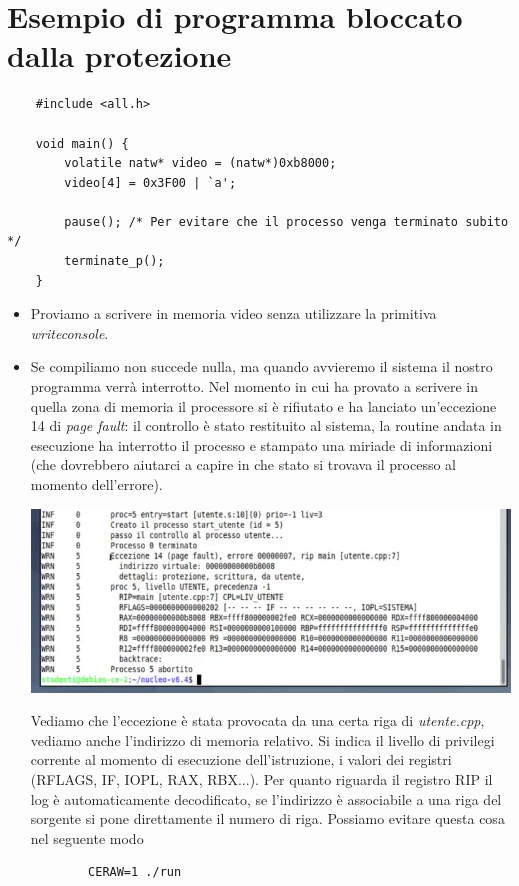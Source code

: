 \section{Esempio di programma bloccato dalla protezione}
\small
\begin{verbatim}
	#include <all.h>
	
	void main() {
		volatile natw* video = (natw*)0xb8000;
		video[4] = 0x3F00 | `a';
		
		pause(); /* Per evitare che il processo venga terminato subito */
		terminate_p();
	}
\end{verbatim}
\normalsize
\begin{itemize}
	\item Proviamo a scrivere in memoria video senza utilizzare la primitiva \emph{writeconsole}.
	\item Se compiliamo non succede nulla, ma quando avvieremo il sistema il nostro programma verrà interrotto. Nel momento in cui ha provato a scrivere in quella zona di memoria il processore si è rifiutato e ha lanciato un'eccezione 14 di \emph{page fault}: il controllo è stato restituito al sistema, la routine andata in esecuzione ha interrotto il processo e stampato una miriade di informazioni (che dovrebbero aiutarci a capire in che stato si trovava il processo al momento dell'errore).
	\begin{center}\includegraphics[scale=.85]{img/125.PNG}\end{center}
	Vediamo che l'eccezione è stata provocata da una certa riga di \emph{utente.cpp}, vediamo anche l'indirizzo di memoria relativo. Si indica il livello di privilegi corrente al momento di esecuzione dell'istruzione, i valori dei registri (RFLAGS, IF, IOPL, RAX, RBX...). Per quanto riguarda il registro RIP il log è automaticamente decodificato, se l'indirizzo è associabile a una riga del sorgente si pone direttamente il numero di riga. Possiamo evitare questa cosa nel seguente modo
	\begin{verbatim}
		CERAW=1 ./run
	\end{verbatim}
\end{itemize}

